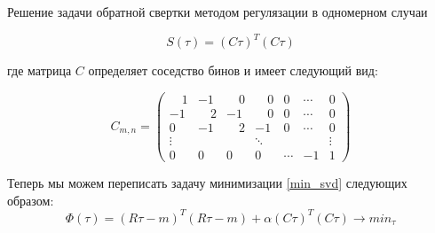 \documentclass[fullscreen=true,russian,compress,%
	hyperref={unicode,bookmarks=false}]{presentation}
\begin{document}


\begin{frame}{Решение задачи обратной свертки методом регулязации в одномерном случаи}

   \begin{equation}
      S(\tau) = (C\tau)^T(C\tau)
  \end{equation}
 
  где матрица $C$ определяет соседство бинов и имеет следующий вид:

   \begin{equation}
       C_{m,n} = 
    \begin{pmatrix}
      \quad 1 &       -1 &  \quad 0 &  \quad 0 & 0 & \cdots & 0 \\
           -1 &  \quad 2 &       -1 &  \quad 0 & 0 & \cdots & 0 \\
            0 &       -1 & \quad  2 &       -1 & 0 & \cdots & 0 \\
     \vdots &  & & \ddots & & & \vdots \\
     0  & 0  & 0 & 0 & \cdots & -1 & 1
    \end{pmatrix}
    \label{one_dim_neighbors_mat}
   \end{equation}

   Теперь мы можем переписать задачу минимизации \eqref{min_svd} следующих образом:
   \begin{equation}
      \Phi(\tau)=(R\tau-m)^T (R\tau-m) + \alpha(C\tau)^T(C\tau) \to min_{\tau}
      \label{min_one_dim}
   \end{equation}
\end{frame}
\end{document}
